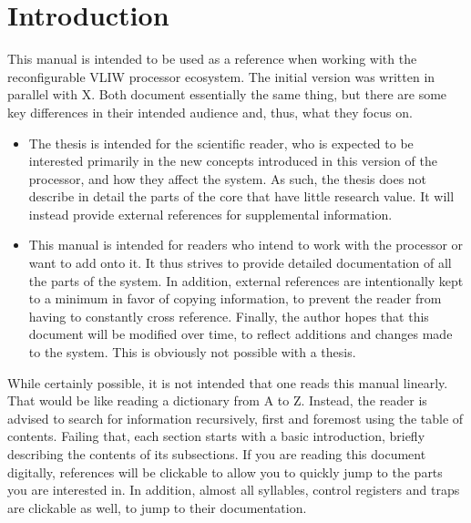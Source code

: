 
\chapter{Introduction}
\label{sec:introduction}

This manual is intended to be used as a reference when working with the \rvex{} 
reconfigurable VLIW processor ecosystem. The initial version was written in 
parallel with X. Both 
document essentially the same thing, but there are some key differences in their 
intended audience and, thus, what they focus on.

\begin{itemize}

\item The thesis is intended for the scientific reader, who is expected to be
interested primarily in the new concepts introduced in this version of the
\rvex{} processor, and how they affect the system. As such, the thesis does not
describe in detail the parts of the \rvex{} core that have little research
value. It will instead provide external references for supplemental information.

\item This manual is intended for readers who intend to work with the \rvex{} 
processor or want to add onto it. It thus strives to provide detailed 
documentation of all the parts of the system. In addition, external references 
are intentionally kept to a minimum in favor of copying information, to prevent 
the reader from having to constantly cross reference. Finally, the author hopes 
that this document will be modified over time, to reflect additions and changes 
made to the system. This is obviously not possible with a thesis.

\end{itemize}

\noindent While certainly possible, it is not intended that one reads this 
manual linearly. That would be like reading a dictionary from A to Z. Instead,
the reader is advised to search for information recursively, first and foremost
using the table of contents. Failing that, each section starts with a basic
introduction, briefly describing the contents of its subsections. If you are
reading this document digitally, references will be clickable to allow you to
quickly jump to the parts you are interested in. In addition, almost all
syllables, control registers and traps are clickable as well, to jump to their
documentation.

